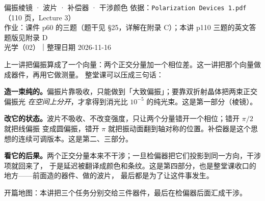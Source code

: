 \documentclass[11pt]{ctexart}
\let\hdrorig\hdr
\renewcommand{\hdr}[2]{\needspace{8\baselineskip}\hdrorig{#1}{#2}}
\begin{document}
{偏振棱镜 · 波片 · 补偿器 · 干涉颜色}
{依据：\texttt{Polarization Devices 1.pdf}（110 页，Lecture 3）\\
作业：课件 p60 的三题（题干见 §25，详解在附录 C）；本讲 p110 三题的英文答题版见附录 D\\
光学（02）｜整理日期 2026-11-16}


上一讲把偏振算成了一个向量：两个正交分量加一个相位差。这一讲把那个向量做成器件，再用它做测量。
整堂课可以压成三句话：

\textbf{造一束纯的。}偏振片靠吸收，只能做到「大致偏振」；要靠双折射晶体把两束正交偏振光
\emph{在空间上分开}，才拿得到消光比 $10^{-5}$ 的纯光束。这是第一部分（棱镜）。

\textbf{改它的状态。}波片不吸收、不改变强度，只让两个分量错开一个相位；错开 $\pi/2$ 就把线偏振
变成圆偏振，错开 $\pi$ 就把振动面翻到轴对称的位置。补偿器是这个思想的连续可调版本。这是第二、三部分。

\textbf{看它的后果。}两个正交分量本来不干涉；一旦检偏器把它们投影到同一方向，干涉项就回来了，
于是延迟被翻译成颜色和条纹。这是第四部分，也是整堂课收口的地方——前面造的器件、做的波片，
最后都是为了让这件事发生。

{\small\color{inkgray}开篇地图：本讲把三个任务分别交给三件器件，最后在检偏器后面汇成干涉。}
\end{document}
